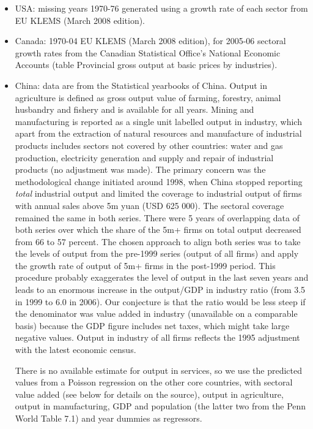 \documentclass[12pt]{article}
\begin{document}
\begin{itemize}
\item USA: missing years 1970-76 generated using a growth rate of each
sector from EU KLEMS (March 2008 edition).

\item Canada: 1970-04 EU KLEMS (March 2008 edition), for 2005-06 sectoral
growth rates from the Canadian Statistical Office's National Economic
Accounts (table Provincial gross output at basic prices by industries).

\item China: data are from the Statistical yearbooks of China. Output in
agriculture is defined as gross output value of farming, forestry, animal
husbandry and fishery and is available for all years. Mining and
manufacturing is reported as a single unit labelled output in industry,
which apart from the extraction of natural resources and manufacture of
industrial products includes sectors not covered by other countries: water
and gas production, electricity generation and supply and repair of
industrial products (no adjustment was made). The primary concern was the
methodological change initiated around 1998, when China stopped reporting 
\textit{total} industrial output and limited the coverage to industrial
output of firms with annual sales above 5m yuan (USD 625 000). The sectoral
coverage remained the same in both series. There were 5 years of overlapping
data of both series over which the share of the 5m+ firms on total output
decreased from 66 to 57 percent. The chosen approach to align both series
was to take the levels of output from the pre-1999 series (output of all
firms) and apply the growth rate of output of 5m+ firms in the post-1999
period. This procedure probably exaggerates the level of output in the last
seven years and leads to an enormous increase in the output/GDP in industry
ratio (from 3.5 in 1999 to 6.0 in 2006). Our conjecture is that the ratio
would be less steep if the denominator was value added in industry
(unavailable on a comparable basis) because the GDP figure includes net
taxes, which might take large negative values. Output in industry of all
firms reflects the 1995 adjustment with the latest economic census.

There is no available estimate for output in services, so we use the
predicted values from a Poisson regression on the other core countries, with
sectoral value added (see below for details on the source), output in
agriculture, output in manufacturing, GDP and population (the latter two
from the Penn World Table 7.1) and year dummies as regressors.


\end{itemize}
\end{document}
